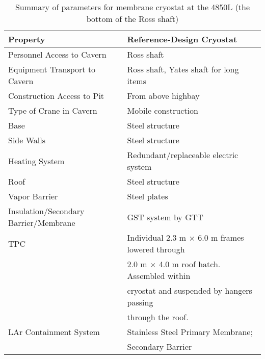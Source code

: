 
\begin{table}
\caption{Summary of parameters for membrane cryostat at the 4850L (the bottom of the Ross shaft)} 
\label{table:cryo-reqs}
\begin{tabular}[htbp]{| p{}|p{}|}
\hline 
\textbf{Property} & \textbf{Reference-Design Cryostat}\\
\hline\hline
Personnel Access to Cavern & Ross shaft\\
\hline
Equipment Transport to Cavern & Ross shaft, Yates shaft for long items \\
\hline
Construction Access to Pit & From above highbay \\
\hline
Type of Crane in Cavern & Mobile construction \\
\hline
Base & Steel structure \\
\hline
Side Walls & Steel structure \\
\hline
Heating System & Redundant/replaceable electric system \\
\hline
Roof & Steel structure \\
\hline
Vapor Barrier & Steel plates  \\
\hline
Insulation/Secondary Barrier/Membrane & GST system by GTT \\
\hline
TPC & Individual 2.3 m $\times$ 6.0 m frames lowered through \\
    & 2.0 m $\times$ 4.0 m roof hatch. Assembled within \\
    & cryostat and suspended by hangers passing \\
    & through the roof. \\
\hline
LAr Containment System & Stainless Steel Primary Membrane; \\
                       & Secondary Barrier \\
            
\hline
\end{tabular} 
\end{table}





